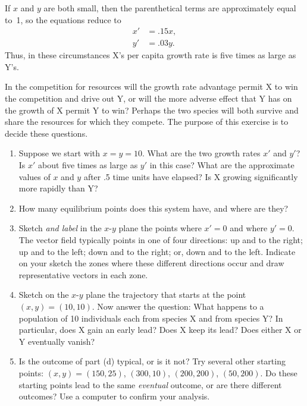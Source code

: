 \begin{enumerate}
If $x$ and $y$ are both small, then the parenthetical terms are
approximately equal to~1, so the equations reduce to
\begin{align*}
x' &= .15x, \\
y' &=  .03y.
\end{align*}
Thus, in these circumstances X's per capita growth rate is five times
as large as Y's.

In the competition for resources will the growth rate advantage permit
X to win the competition and drive out Y, or will the more adverse
effect that Y has on the growth of X permit Y to win?  Perhaps the two
species will both survive and share the resources for which they
compete.  The purpose of this exercise is to decide these questions.

  \begin{enumerate}
  \item Suppose we start with $x = y = 10$.  What are the two growth
rates $x'$ and $y'$?  Is $x'$ about five times as large as $y'$ in
this case?  What are the approximate values of $x$ and $y$ after .5
time units have elapsed?  Is X growing significantly more rapidly than
Y?

  \item How many equilibrium points does this system have, and where are
they?

  \item Sketch {\em and label\/} in the $x$-$y$ plane the points where
$x' = 0$ and where \mbox{$y'= 0$}.  The vector field typically points
in one of four directions: up and to the right; up and to the left;
down and to the right; or, down and to the left.  Indicate on your
sketch the zones where these different directions occur and draw
representative vectors in each zone.






  \item Sketch on the $x$-$y$ plane the trajectory that starts at the
point $(x, y) = (10, 10)$.  Now answer the question: What happens to a
population of 10 individuals each from species X and from species Y?
In particular, does X gain an early lead?  Does X keep its lead?  Does
either X or Y eventually vanish?

  \item Is the outcome of part (d) typical, or is it not?  Try several
other starting points: $(x, y) = (150, 25)$, $(300, 10)$, $(200,
200)$, $(50, 200)$.  Do these starting points lead to the same {\em
  eventual\/} outcome, or are there different outcomes?  Use a
computer to confirm your analysis.


\end{enumerate}
\end{enumerate}
